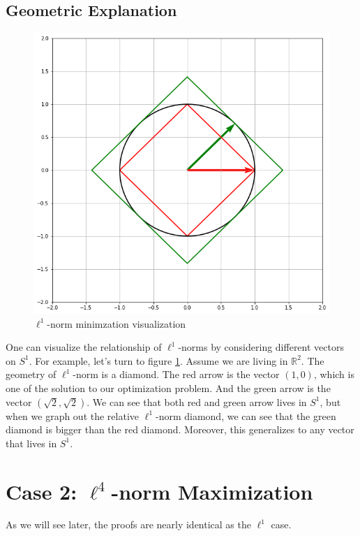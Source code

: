 \documentclass[11pt]{article}
\begin{document}
\subsection{Geometric Explanation}
    \begin{figure}[h]
        \centering
        \includegraphics[scale=0.4]{l1norm_bound.png}
        \caption{$\ell^{1}$-norm minimzation visualization}
        \label{fig:l1_bound}
    \end{figure}
    One can visualize the relationship of $\ell^1$-norms by considering different vectors on $S^1$. For example, let's turn to figure \ref{fig:l1_bound}. Assume we are living in $\mathbb{R}^2$. The geometry of $\ell^1$-norm is a diamond. The red arrow is the vector $(1, 0)$, which is one of the solution to our optimization problem. And the green arrow is the vector $(\sqrt{2}, \sqrt{2})$. We can see that both red and green arrow lives in $S^1$, but when we graph out the relative $\ell^1$-norm diamond, we can see that the green diamond is bigger than the red diamond. Moreover, this generalizes to any vector that lives in $S^1$. 


\section{Case 2: $\ell^4$-norm Maximization}
	As we will see later, the proofs are nearly identical as the $\ell^{1}$ case.
\end{document}

